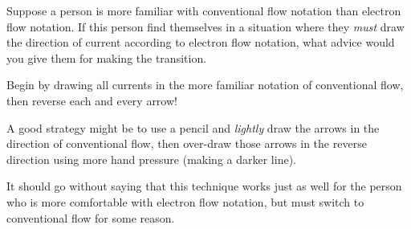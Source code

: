 

Suppose a person is more familiar with conventional flow notation than electron flow notation.  If this person find themselves in a situation where they {\it must} draw the direction of current according to electron flow notation, what advice would you give them for making the transition.







Begin by drawing all currents in the more familiar notation of conventional flow, then reverse each and every arrow!







A good strategy might be to use a pencil and {\it lightly} draw the arrows in the direction of conventional flow, then over-draw those arrows in the reverse direction using more hand pressure (making a darker line).

It should go without saying that this technique works just as well for the person who is more comfortable with electron flow notation, but must switch to conventional flow for some reason.




